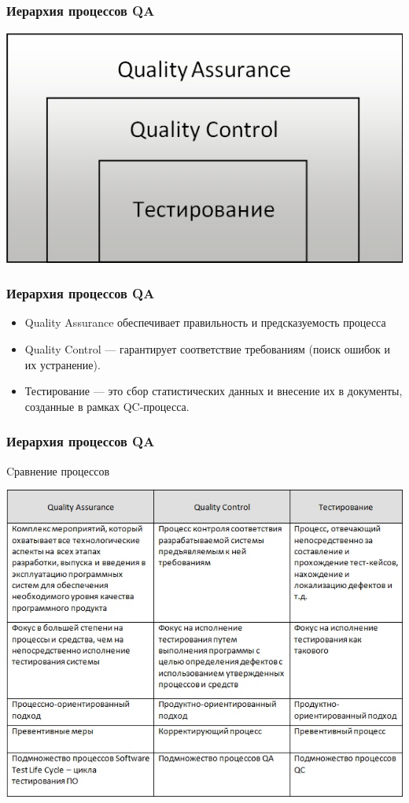 \documentclass{../industrial-development}
\begin{document}
	\begin{frame} \frametitle{Иерархия процессов QA}
		\centerline{\includegraphics[height=0.7\textheight]{QA_QC2.png}}
	\end{frame}
	
	\begin{frame} \frametitle{Иерархия процессов QA}
		\begin{itemize}
			\item Quality Assurance обеспечивает правильность и предсказуемость процесса 
			
			\item Quality Control --- гарантирует соответствие требованиям (поиск ошибок и их устранение).
			
			\item Тестирование --- это сбор статистических данных и внесение их в документы, созданные в рамках QC-процесса.
		\end{itemize}
	\end{frame}
	
	\begin{frame} \frametitle{Иерархия процессов QA}
		\begin{block}{}
			\centerline{	Cравнение процессов	}
		\end{block}
		\centerline{\includegraphics[height=0.7\textheight]{QA_QC.png}}
	\end{frame}
		
\end{document}
